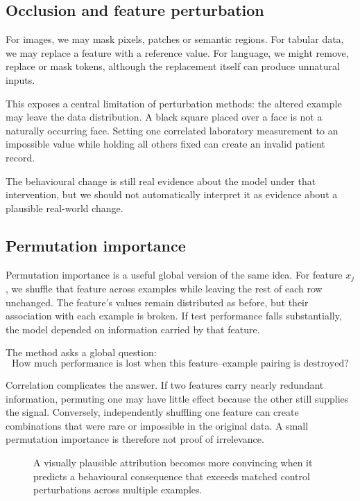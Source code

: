\subsection{Occlusion and feature perturbation}

For images, we may mask pixels, patches or semantic regions. For tabular data, we may replace a feature with a reference value. For language, we might remove, replace or mask tokens, although the replacement itself can produce unnatural inputs.

This exposes a central limitation of perturbation methods: the altered example may leave the data distribution. A black square placed over a face is not a naturally occurring face. Setting one correlated laboratory measurement to an impossible value while holding all others fixed can create an invalid patient record.

The behavioural change is still real evidence about the model under that intervention, but we should not automatically interpret it as evidence about a plausible real-world change.

\subsection{Permutation importance}

Permutation importance is a useful global version of the same idea. For feature \(x_j\), we shuffle that feature across examples while leaving the rest of each row unchanged. The feature's values remain distributed as before, but their association with each example is broken. If test performance falls substantially, the model depended on information carried by that feature.

The method asks a global question:
\[
  \text{How much performance is lost when this feature--example pairing is destroyed?}
\]

Correlation complicates the answer. If two features carry nearly redundant information, permuting one may have little effect because the other still supplies the signal. Conversely, independently shuffling one feature can create combinations that were rare or impossible in the original data. A small permutation importance is therefore not proof of irrelevance.

\begin{figure}[ht]
  \caption{A visually plausible attribution becomes more convincing when it predicts a behavioural consequence that exceeds matched control perturbations across multiple examples.}
  \label{fig:week6-faithfulness}
\end{figure}

